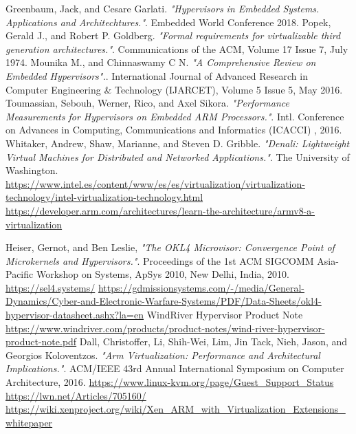 \documentclass[spanish,12pt,a4paper,oneside]{book}
\begin{document}
\begin{thebibliography}{00}

	  Greenbaum, Jack, and Cesare Garlati. \emph{"Hypervisors in Embedded Systems. Applications and Architechtures."}. Embedded World Conference 2018.
	 Popek, Gerald J., and Robert P. Goldberg. \emph{"Formal requirements for virtualizable third generation architectures."}. Communications of the ACM, Volume 17 Issue 7, July 1974.
	 Mounika M., and Chinnaswamy C N. \emph{"A Comprehensive Review on Embedded Hypervisors".}. International Journal of Advanced Research in Computer Engineering \& Technology (IJARCET), Volume 5 Issue 5, May 2016.
	 Toumassian, Sebouh, Werner, Rico, and Axel Sikora. \emph{"Performance Measurements for Hypervisors on Embedded ARM Processors."}. Intl. Conference on Advances in Computing, Communications and Informatics (ICACCI) , 2016.
	 Whitaker, Andrew, Shaw, Marianne, and Steven D. Gribble. \emph{"Denali: Lightweight Virtual Machines for Distributed and Networked Applications."}. The University of Washington.
   \url{https://www.intel.es/content/www/es/es/virtualization/virtualization-technology/intel-virtualization-technology.html}
   \url{https://developer.arm.com/architectures/learn-the-architecture/armv8-a-virtualization}

   Heiser, Gernot, and Ben Leslie, \emph{"The OKL4 Microvisor: Convergence Point of Microkernels and Hypervisors."}. Proceedings of the 1st ACM SIGCOMM Asia-Pacific Workshop on Systems, ApSys 2010, New Delhi, India, 2010.
   \url{https://sel4.systems/}
   \url{https://gdmissionsystems.com/-/media/General-Dynamics/Cyber-and-Electronic-Warfare-Systems/PDF/Data-Sheets/okl4-hypervisor-datasheet.ashx?la=en}
   WindRiver Hypervisor Product Note \url{https://www.windriver.com/products/product-notes/wind-river-hypervisor-product-note.pdf}
   Dall, Christoffer, Li, Shih-Wei, Lim, Jin Tack, Nieh, Jason, and Georgios Koloventzos. \emph{"Arm Virtualization: Performance and Architectural Implications."}. ACM/IEEE 43rd Annual International Symposium on Computer Architecture, 2016.
   \url{https://www.linux-kvm.org/page/Guest_Support_Status}
	 \url{https://lwn.net/Articles/705160/}
   \url{https://wiki.xenproject.org/wiki/Xen_ARM_with_Virtualization_Extensions_whitepaper}



\end{thebibliography}
\end{document}

